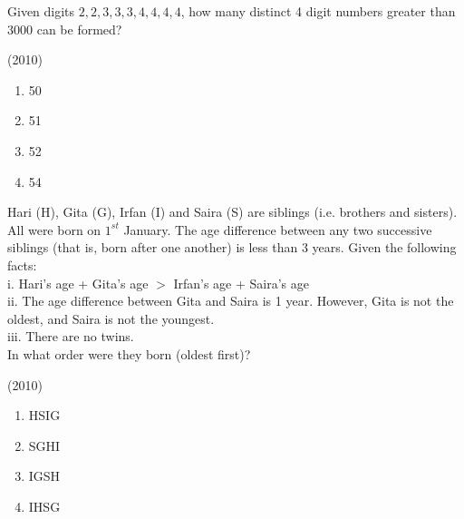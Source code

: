     \item Given digits $2,2,3,3,3,4,4,4,4$, how many distinct 4 digit numbers greater than 3000 can be formed?
    
    \hfill{(2010)}

        \begin{multicols}{4}
            \begin{enumerate}
                \item 50
                \item 51
                \item 52
                \item 54
            \end{enumerate}
        \end{multicols}
        
    \item Hari (H), Gita (G), Irfan (I) and Saira (S) are siblings (i.e. brothers and sisters). All were born on $1^{st}$ January. The age difference between any two successive siblings (that is, born after one another) is less than 3 years. Given the following facts:\\
    i. Hari's age + Gita's age $>$ Irfan's age + Saira's age\\
    ii. The age difference between Gita and Saira is 1 year. However, Gita is not the oldest, and Saira is not the youngest.\\
    iii. There are no twins.\\
    In what order were they born (oldest first)? 
    
    \hfill{(2010)}

        \begin{multicols}{4}
            \begin{enumerate}
                \item HSIG
                \item SGHI
                \item IGSH
                \item IHSG
            \end{enumerate}
        \end{multicols}

